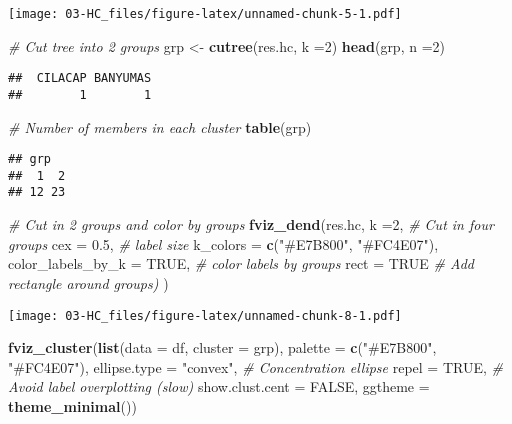 \documentclass[
]{elegantbook}
\newenvironment{Shaded}{\begin{snugshade}}{\end{snugshade}}
\newcommand{\AttributeTok}[1]{\textcolor[rgb]{0.13,0.29,0.53}{#1}}
\newcommand{\CommentTok}[1]{\textcolor[rgb]{0.56,0.35,0.01}{\textit{#1}}}
\newcommand{\ConstantTok}[1]{\textcolor[rgb]{0.56,0.35,0.01}{#1}}
\newcommand{\DecValTok}[1]{\textcolor[rgb]{0.00,0.00,0.81}{#1}}
\newcommand{\FloatTok}[1]{\textcolor[rgb]{0.00,0.00,0.81}{#1}}
\newcommand{\FunctionTok}[1]{\textcolor[rgb]{0.13,0.29,0.53}{\textbf{#1}}}
\newcommand{\NormalTok}[1]{#1}
\newcommand{\OtherTok}[1]{\textcolor[rgb]{0.56,0.35,0.01}{#1}}
\newcommand{\StringTok}[1]{\textcolor[rgb]{0.31,0.60,0.02}{#1}}
\begin{document}
\texttt{[image: 03-HC\_files/figure-latex/unnamed-chunk-5-1.pdf]}

\begin{Shaded}
\begin{Highlighting}[]
\CommentTok{\# Cut tree into 2 groups}
\NormalTok{grp }\OtherTok{\textless{}{-}} \FunctionTok{cutree}\NormalTok{(res.hc, }\AttributeTok{k =}\DecValTok{2}\NormalTok{)}
\FunctionTok{head}\NormalTok{(grp, }\AttributeTok{n =}\DecValTok{2}\NormalTok{)}
\end{Highlighting}
\end{Shaded}

\begin{verbatim}
##  CILACAP BANYUMAS 
##        1        1
\end{verbatim}

\begin{Shaded}
\begin{Highlighting}[]
\CommentTok{\# Number of members in each cluster}
\FunctionTok{table}\NormalTok{(grp)}
\end{Highlighting}
\end{Shaded}

\begin{verbatim}
## grp
##  1  2 
## 12 23
\end{verbatim}

\begin{Shaded}
\begin{Highlighting}[]
\CommentTok{\# Cut in 2 groups and color by groups}
\FunctionTok{fviz\_dend}\NormalTok{(res.hc, }\AttributeTok{k =}\DecValTok{2}\NormalTok{, }\CommentTok{\# Cut in four groups}
          \AttributeTok{cex =} \FloatTok{0.5}\NormalTok{, }\CommentTok{\# label size}
          \AttributeTok{k\_colors =} \FunctionTok{c}\NormalTok{(}\StringTok{"\#E7B800"}\NormalTok{, }\StringTok{"\#FC4E07"}\NormalTok{),}
          \AttributeTok{color\_labels\_by\_k =} \ConstantTok{TRUE}\NormalTok{, }\CommentTok{\# color labels by groups}
          \AttributeTok{rect =} \ConstantTok{TRUE} \CommentTok{\# Add rectangle around groups)}
\NormalTok{          )}
\end{Highlighting}
\end{Shaded}

\texttt{[image: 03-HC\_files/figure-latex/unnamed-chunk-8-1.pdf]}

\begin{Shaded}
\begin{Highlighting}[]
\FunctionTok{fviz\_cluster}\NormalTok{(}\FunctionTok{list}\NormalTok{(}\AttributeTok{data =}\NormalTok{ df, }\AttributeTok{cluster =}\NormalTok{ grp),}
\AttributeTok{palette =} \FunctionTok{c}\NormalTok{(}\StringTok{"\#E7B800"}\NormalTok{, }\StringTok{"\#FC4E07"}\NormalTok{),}
\AttributeTok{ellipse.type =} \StringTok{"convex"}\NormalTok{, }\CommentTok{\# Concentration ellipse}
\AttributeTok{repel =} \ConstantTok{TRUE}\NormalTok{, }\CommentTok{\# Avoid label overplotting (slow)}
\AttributeTok{show.clust.cent =} \ConstantTok{FALSE}\NormalTok{, }\AttributeTok{ggtheme =} \FunctionTok{theme\_minimal}\NormalTok{())}
\end{Highlighting}
\end{Shaded}
\end{document}
